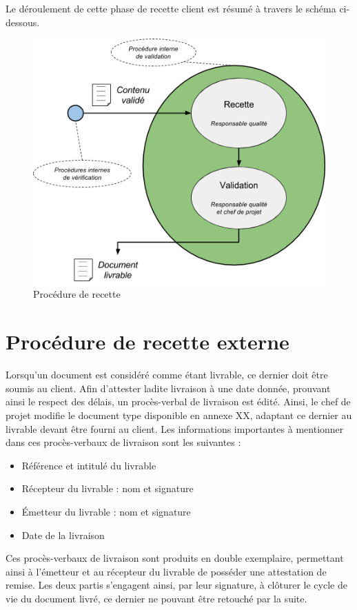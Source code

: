 Le déroulement de cette phase de recette client est résumé à travers le schéma ci-dessous.

\begin{figure}[H]
    \centering
    \label{fig-recette}
    \includegraphics[scale=0.5]{figures/recette_part.png}
    \caption{Procédure de recette}
\end{figure}

\section{Procédure de recette externe}

Lorsqu’un document est considéré comme étant livrable, ce dernier doit être soumis au client. Afin d’attester ladite livraison à une date donnée, prouvant ainsi le respect des délais, un procès-verbal de livraison est édité. Ainsi, le chef de projet modifie le document type disponible en annexe XX, adaptant ce dernier au livrable devant être fourni au client. Les informations importantes à mentionner dans ces procès-verbaux de livraison sont les suivantes : \\

\begin{itemize}
    \item[\textbullet] Référence et intitulé du livrable
    \item[\textbullet] Récepteur du livrable : nom et signature
    \item[\textbullet] Émetteur du livrable : nom et signature
    \item[\textbullet] Date de la livraison \\
\end{itemize}

Ces procès-verbaux de livraison sont produits en double exemplaire, permettant ainsi à l’émetteur et au récepteur du livrable de posséder une attestation de remise. Les deux partis s’engagent ainsi, par leur signature, à clôturer le cycle de vie du document livré, ce dernier ne pouvant être retouché par la suite.

